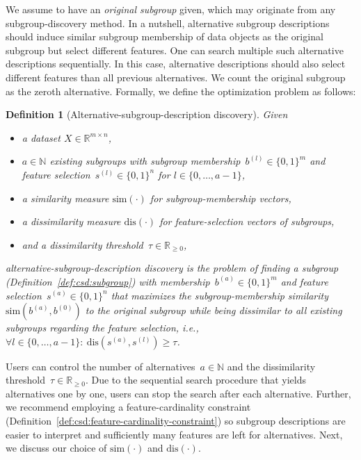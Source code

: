 \documentclass[acmsmall]{acmart} %
\theoremstyle{acmplain}
\theoremstyle{acmdefinition}
\newtheorem{definition}{Definition}
\begin{document}
We assume to have an \emph{original subgroup} given, which may originate from any subgroup-discovery method.
In a nutshell, alternative subgroup descriptions should induce similar subgroup membership of data objects as the original subgroup but select different features.
One can search multiple such alternative descriptions sequentially. 
In this case, alternative descriptions should also select different features than all previous alternatives.
We count the original subgroup as the zeroth alternative.
Formally, we define the optimization problem as follows:
%
\begin{definition}[Alternative-subgroup-description discovery]
	Given
	\begin{itemize}[noitemsep]
		\item a dataset $X \in \mathbb{R}^{m \times n}$,
		\item $a \in \mathbb{N}$ existing subgroups with subgroup membership~$b^{(l)} \in \{0, 1\}^m$ and feature selection~$s^{(l)} \in \{0, 1\}^n$ for $l \in \{0, \dots, a - 1\}$,
		\item a similarity measure $\text{sim}(\cdot)$ for subgroup-membership vectors,
		\item a dissimilarity measure $\text{dis}(\cdot)$ for feature-selection vectors of subgroups,
		\item and a dissimilarity threshold~$\tau \in \mathbb{R}_{\geq 0}$,
	\end{itemize}
	\emph{alternative-subgroup-description discovery} is the problem of finding a subgroup (Definition~\ref{def:csd:subgroup}) with membership~$b^{(a)} \in \{0, 1\}^m$ and feature selection~$s^{(a)} \in \{0, 1\}^n$ that maximizes the subgroup-membership similarity $\text{sim}(b^{(a)}, b^{(0)})$ to the original subgroup while being dissimilar to all existing subgroups regarding the feature selection, i.e., $\forall l \in \{0, \dots, a-1\}:~\text{dis}(s^{(a)}, s^{(l)}) \geq \tau$.
	\label{def:csd:alternative-subgroup-description-discovery}
\end{definition}
%
Users can control the number of alternatives~$a \in \mathbb{N}$ and the dissimilarity threshold~$\tau \in \mathbb{R}_{\geq 0}$.
Due to the sequential search procedure that yields alternatives one by one, users can stop the search after each alternative.
Further, we recommend employing a feature-cardinality constraint (Definition~\ref{def:csd:feature-cardinality-constraint}) so subgroup descriptions are easier to interpret and sufficiently many features are left for alternatives.
Next, we discuss our choice of $\text{sim}(\cdot)$ and $\text{dis}(\cdot)$.
\end{document}
